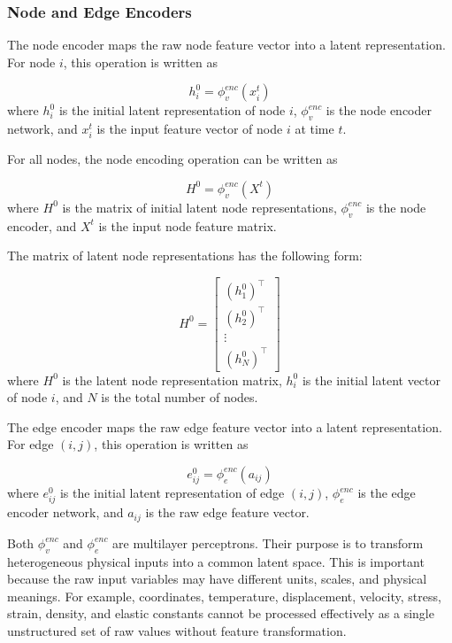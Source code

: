 \subsubsection{Node and Edge Encoders}

The node encoder maps the raw node feature vector into a latent representation. For node \(i\), this operation is written as

\begin{equation}
h_i^{0}
=
\phi_v^{enc}
\left(
x_i^t
\right)
\end{equation}
where \(h_i^{0}\) is the initial latent representation of node \(i\), \(\phi_v^{enc}\) is the node encoder network, and \(x_i^t\) is the input feature vector of node \(i\) at time \(t\).

For all nodes, the node encoding operation can be written as

\begin{equation}
H^{0}
=
\phi_v^{enc}
\left(
X^{t}
\right)
\end{equation}
where \(H^{0}\) is the matrix of initial latent node representations, \(\phi_v^{enc}\) is the node encoder, and \(X^{t}\) is the input node feature matrix.

The matrix of latent node representations has the following form:

\begin{equation}
H^{0}
=
\begin{bmatrix}
(h_1^{0})^{\top} \\
(h_2^{0})^{\top} \\
\vdots \\
(h_N^{0})^{\top}
\end{bmatrix}
\end{equation}
where \(H^{0}\) is the latent node representation matrix, \(h_i^{0}\) is the initial latent vector of node \(i\), and \(N\) is the total number of nodes.

The edge encoder maps the raw edge feature vector into a latent representation. For edge \((i,j)\), this operation is written as

\begin{equation}
e_{ij}^{0}
=
\phi_e^{enc}
\left(
a_{ij}
\right)
\end{equation}
where \(e_{ij}^{0}\) is the initial latent representation of edge \((i,j)\), \(\phi_e^{enc}\) is the edge encoder network, and \(a_{ij}\) is the raw edge feature vector.

Both \(\phi_v^{enc}\) and \(\phi_e^{enc}\) are multilayer perceptrons. Their purpose is to transform heterogeneous physical inputs into a common latent space. This is important because the raw input variables may have different units, scales, and physical meanings. For example, coordinates, temperature, displacement, velocity, stress, strain, density, and elastic constants cannot be processed effectively as a single unstructured set of raw values without feature transformation.


